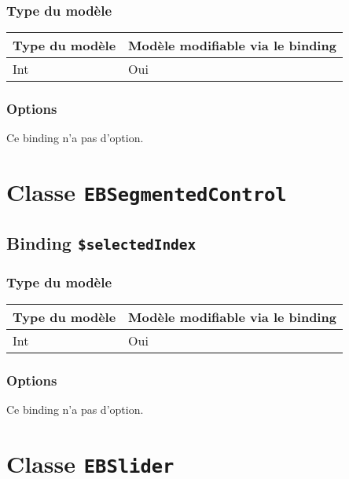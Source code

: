 \subsubsection{Type du modèle}

\begin{tabular}{|l|l|}
\hline
\textbf{Type du modèle} & \textbf{Modèle modifiable via le binding}\\
\hline
Int & Oui\\
\hline
\end{tabular}
\subsubsection{Options}

Ce binding n'a pas d'option.








\section{Classe \texttt{EBSegmentedControl}}

\subsection{Binding \texttt{\$selectedIndex}}

\subsubsection{Type du modèle}

\begin{tabular}{|l|l|}
\hline
\textbf{Type du modèle} & \textbf{Modèle modifiable via le binding}\\
\hline
Int & Oui\\
\hline
\end{tabular}
\subsubsection{Options}

Ce binding n'a pas d'option.








\section{Classe \texttt{EBSlider}}


